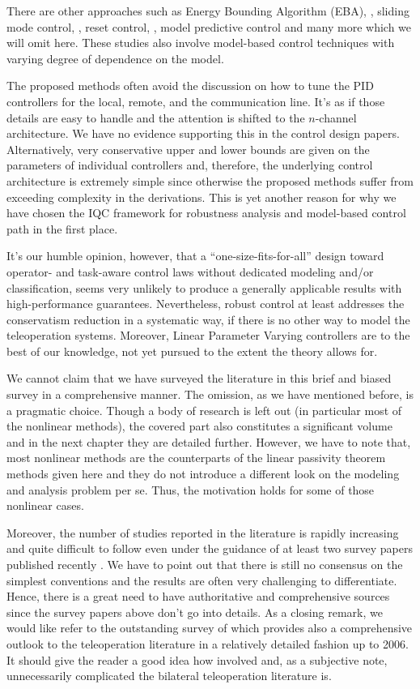 There are other approaches such as Energy Bounding Algorithm (EBA), \cite{kimryu,seokim}, sliding mode control, 
\cite{parkcho,buttolo}, reset control, \cite{villaverdereset}, model predictive control \cite{bemporad,shengspong} 
and many more which we will omit here. These studies also involve model-based control techniques with varying degree 
of dependence on the model.


The proposed methods often avoid the discussion on how to tune the PID controllers for the local, remote,
and the communication line. It's as if those details are easy to handle and the attention is shifted to the $n$-channel
architecture. We have no evidence supporting this in the control design papers. Alternatively, very conservative 
upper and lower bounds are given on the parameters of individual controllers and, therefore, the underlying 
control architecture is extremely simple since otherwise the proposed methods suffer from exceeding complexity in 
the derivations. This is yet another reason for why we have chosen the IQC framework for robustness analysis and 
model-based control path in the first place. 

It's our humble opinion, however, that a \enquote{one-size-fits-for-all} design toward operator- and task-aware 
control laws without dedicated modeling and/or classification, seems very unlikely to produce a generally applicable 
results with high-performance guarantees. Nevertheless, robust control at least addresses the conservatism reduction 
in a systematic way, if there is no other way to model the teleoperation systems. Moreover, Linear Parameter Varying
controllers are to the best of our knowledge, not yet pursued to the extent the theory allows for.


We cannot claim that we have surveyed the literature in this brief and biased survey in a comprehensive manner.
The omission, as we have mentioned before, is a pragmatic choice. Though a body of research is left out (in particular
most of the nonlinear methods), the covered part also constitutes a significant volume and in the next chapter 
they are detailed further. However, we have to note that, most nonlinear methods are the counterparts of the linear 
passivity theorem methods given here and they do not introduce a different look on the modeling and analysis problem 
per se. Thus, the motivation holds for some of those nonlinear cases. 

Moreover, the number of studies reported in the literature is rapidly increasing and quite difficult to follow 
even under the guidance of at least two survey papers published recently \cite{hokayemspong,
passenberg}. We have to point out that there is still no consensus on the simplest conventions and the results are 
often very challenging to differentiate. Hence, there is a great need to have authoritative and comprehensive sources
since the survey papers above don't go into details. As a closing remark, we would like refer to the outstanding 
survey of \cite{klomp} which provides also a comprehensive outlook to the teleoperation literature in a relatively detailed 
fashion up to 2006. It should give the reader a good idea how involved and, as a subjective note, unnecessarily 
complicated the bilateral teleoperation literature is. 

